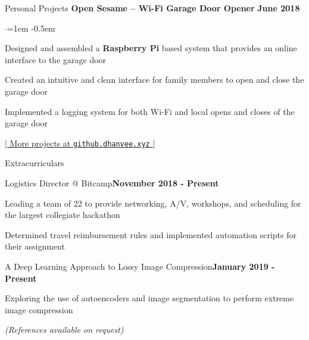 \documentclass[mm,centered]{resume} %
\begin{document}
\begin{rSection}{Personal Projects}
{\bf Open Sesame – Wi-Fi Garage Door Opener}  \hfill {\bf June 2018}
 \begin{list}{$\cdot$}{\leftmargin=1em} %
   \itemsep -0.5em \vspace{-0.5em} %
	\item 
		Designed and assembled a \textbf{Raspberry Pi} based system that provides an online interface to the garage door
	\item
		Created an intuitive and clean interface for family members to open and close the garage door
	\item
		Implemented a logging system for both Wi-Fi and local opens and closes of the garage door
  \end{list}
\vspace{-1.25mm}
\begin{center}
	\href{http://github.dhanvee.xyz}{| More projects at \texttt{github.dhanvee.xyz} |}
\end{center}
\vspace{-2mm}
\end{rSection}



\begin{rSection}{Extracurriculars} 

	\begin{rSubsection}{Logistics Director @ Bitcamp}{\textbf{November 2018 - Present}}{}{}
		\item Leading a team of 22 to provide networking, A/V, workshops, and scheduling for the largest collegiate hackathon
		\item Determined travel reimbursement rules and implemented automation scripts for their assignment
	\end{rSubsection}
	
	\begin{rSubsection}{A Deep Learning Approach to Lossy Image Compression}{\textbf{January 2019 - Present}}{}{}
		\item Exploring the use of autoencoders and image segmentation to perform extreme image compression

	\end{rSubsection}


\end{rSection}

\begin{center}
	\vspace{4mm}
	\textit{(References available on request)}
\end{center}
\end{document}
